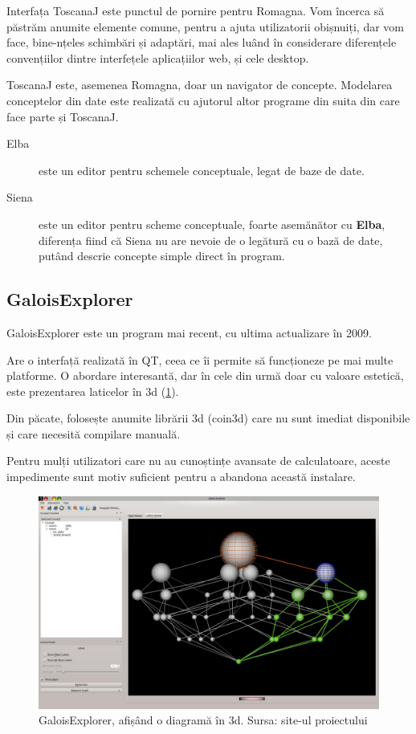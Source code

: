\documentclass[12pt, a4paper, twoside, romanian]{teza-upb}
\begin{document}
        Interfața ToscanaJ este punctul de pornire pentru Romagna. Vom încerca să păstrăm anumite elemente comune, pentru a ajuta utilizatorii obișnuiți, dar vom face, bine-nțeles schimbări și adaptări, mai ales luând în considerare diferențele convențiilor dintre interfețele aplicațiilor web, și cele desktop.

        ToscanaJ este, asemenea Romagna, doar un navigator de concepte. Modelarea conceptelor din date este realizată cu ajutorul altor programe din suita din care face parte și ToscanaJ.

        \begin{description}
            \item[Elba] este un editor pentru schemele conceptuale, legat de baze de date.
            \item[Siena] este un editor pentru scheme conceptuale, foarte asemănător cu \textbf{Elba}, diferența fiind că Siena nu are nevoie de o legătură cu o bază de date, putând descrie concepte simple direct în program.
        \end{description}

  \subsection{GaloisExplorer}
    GaloisExplorer \cite{GaloisExplorer:homepage} este un program mai recent, cu ultima actualizare în 2009.

    Are o interfață realizată în QT, ceea ce îi permite să funcționeze pe mai multe platforme. O abordare interesantă, dar în cele din urmă doar cu valoare estetică, este prezentarea laticelor în 3d (\ref{screenshot:galoisexplorer}).
   
    Din păcate, folosește anumite librării 3d (coin3d\cite{Coin:homepage}) care nu sunt imediat disponibile și care necesită compilare manuală.

    Pentru mulți utilizatori care nu au cunoștințe avansate de calculatoare, aceste impedimente sunt motiv suficient pentru a abandona această instalare.
    \begin{figure}[h]
      \centering
      \includegraphics[width=\textwidth]{GaloisExplorer_latticeView}
      \caption{GaloisExplorer, afișând o diagramă în 3d. Sursa: site-ul proiectului \cite{GaloisExplorer:sourceforge}}
      \label{screenshot:galoisexplorer}
    \end{figure}
\end{document}

